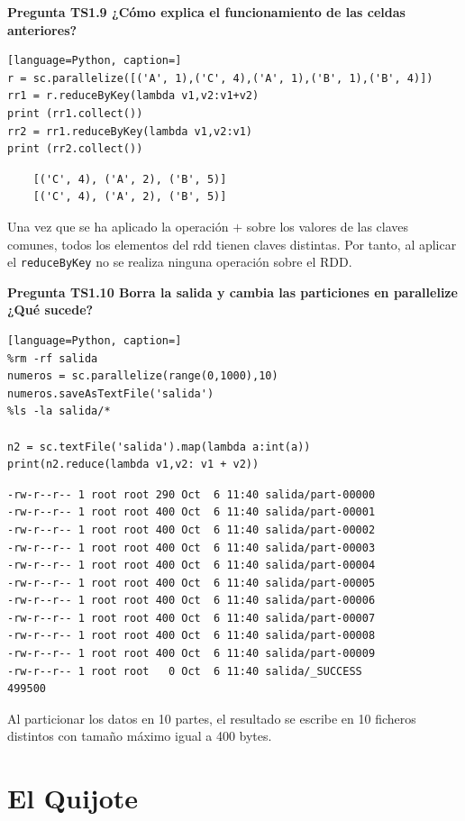 \documentclass[10pt,swedish, openany]{book}
\begin{document}
\textbf{Pregunta TS1.9 ¿Cómo explica el funcionamiento de las celdas anteriores?}


\begin{lstlisting}[language=Python, caption=]
r = sc.parallelize([('A', 1),('C', 4),('A', 1),('B', 1),('B', 4)])
rr1 = r.reduceByKey(lambda v1,v2:v1+v2)
print (rr1.collect())
rr2 = rr1.reduceByKey(lambda v1,v2:v1)
print (rr2.collect())
\end{lstlisting}
\begin{verbatim}
    [('C', 4), ('A', 2), ('B', 5)]
    [('C', 4), ('A', 2), ('B', 5)]
\end{verbatim}
Una vez que se ha aplicado la operación $+$ sobre los valores de las claves comunes, todos los elementos del rdd tienen claves distintas. Por tanto, al aplicar el \texttt{reduceByKey} no se realiza ninguna operación sobre el RDD.

\vspace{0.8em}

\textbf{Pregunta TS1.10 Borra la salida y cambia las particiones en parallelize ¿Qué sucede?}

\begin{lstlisting}[language=Python, caption=]
%rm -rf salida
numeros = sc.parallelize(range(0,1000),10)
numeros.saveAsTextFile('salida')
%ls -la salida/*

n2 = sc.textFile('salida').map(lambda a:int(a))
print(n2.reduce(lambda v1,v2: v1 + v2))
\end{lstlisting}
\begin{verbatim}
-rw-r--r-- 1 root root 290 Oct  6 11:40 salida/part-00000
-rw-r--r-- 1 root root 400 Oct  6 11:40 salida/part-00001
-rw-r--r-- 1 root root 400 Oct  6 11:40 salida/part-00002
-rw-r--r-- 1 root root 400 Oct  6 11:40 salida/part-00003
-rw-r--r-- 1 root root 400 Oct  6 11:40 salida/part-00004
-rw-r--r-- 1 root root 400 Oct  6 11:40 salida/part-00005
-rw-r--r-- 1 root root 400 Oct  6 11:40 salida/part-00006
-rw-r--r-- 1 root root 400 Oct  6 11:40 salida/part-00007
-rw-r--r-- 1 root root 400 Oct  6 11:40 salida/part-00008
-rw-r--r-- 1 root root 400 Oct  6 11:40 salida/part-00009
-rw-r--r-- 1 root root   0 Oct  6 11:40 salida/_SUCCESS
499500
\end{verbatim}

Al particionar los datos en 10 partes, el resultado se escribe en 10 ficheros distintos con tamaño máximo igual a 400 bytes.

\section{El Quijote}
\end{document}
